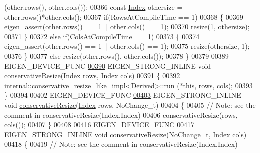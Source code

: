 \begin{DoxyCode}
      (other.rows(), other.cols());
00366       \textcolor{keyword}{const} \hyperlink{namespace_eigen_a62e77e0933482dafde8fe197d9a2cfde}{Index} othersize = other.rows()*other.cols();
00367       \textcolor{keywordflow}{if}(RowsAtCompileTime == 1)
00368       \{
00369         eigen\_assert(other.rows() == 1 || other.cols() == 1);
00370         resize(1, othersize);
00371       \}
00372       \textcolor{keywordflow}{else} \textcolor{keywordflow}{if}(ColsAtCompileTime == 1)
00373       \{
00374         eigen\_assert(other.rows() == 1 || other.cols() == 1);
00375         resize(othersize, 1);
00376       \}
00377       \textcolor{keywordflow}{else} resize(other.rows(), other.cols());
00378     \}
00379 
00389     EIGEN\_DEVICE\_FUNC
\hyperlink{class_eigen_1_1_plain_object_base_a5e06c62950ba98fe8ba9c7d4be9c19e4}{00390}     EIGEN\_STRONG\_INLINE \textcolor{keywordtype}{void} \hyperlink{class_eigen_1_1_plain_object_base_a5e06c62950ba98fe8ba9c7d4be9c19e4}{conservativeResize}(\hyperlink{namespace_eigen_a62e77e0933482dafde8fe197d9a2cfde}{Index} rows, 
      \hyperlink{namespace_eigen_a62e77e0933482dafde8fe197d9a2cfde}{Index} cols)
00391     \{
00392       \hyperlink{struct_eigen_1_1internal_1_1conservative__resize__like__impl}{internal::conservative\_resize\_like\_impl<Derived>::run}
      (*\textcolor{keyword}{this}, rows, cols);
00393     \}
00394 
00402     EIGEN\_DEVICE\_FUNC
\hyperlink{class_eigen_1_1_plain_object_base_a528879aef40f9cbc4ab4925e4a6bceb9}{00403}     EIGEN\_STRONG\_INLINE \textcolor{keywordtype}{void} \hyperlink{class_eigen_1_1_plain_object_base_a528879aef40f9cbc4ab4925e4a6bceb9}{conservativeResize}(\hyperlink{namespace_eigen_a62e77e0933482dafde8fe197d9a2cfde}{Index} rows, NoChange\_t)
00404     \{
00405       \textcolor{comment}{// Note: see the comment in conservativeResize(Index,Index)}
00406       conservativeResize(rows, cols());
00407     \}
00408 
00416     EIGEN\_DEVICE\_FUNC
\hyperlink{class_eigen_1_1_plain_object_base_a46afa73816539b0fe36c6e9abd7978a6}{00417}     EIGEN\_STRONG\_INLINE \textcolor{keywordtype}{void} \hyperlink{class_eigen_1_1_plain_object_base_a46afa73816539b0fe36c6e9abd7978a6}{conservativeResize}(NoChange\_t, 
      \hyperlink{namespace_eigen_a62e77e0933482dafde8fe197d9a2cfde}{Index} cols)
00418     \{
00419       \textcolor{comment}{// Note: see the comment in conservativeResize(Index,Index)}

\end{DoxyCode}
